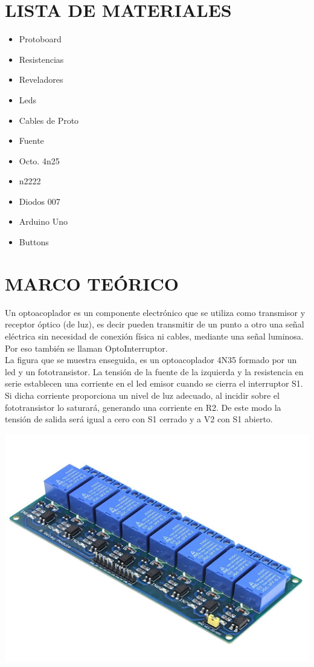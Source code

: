 \documentclass[12pt,letterpaper]{article}
\begin{document}
	\section{\textbf{LISTA DE MATERIALES}}
	\begin{itemize}
	\item Protoboard
	\item Resistencias
	\item Reveladores
	\item Leds
	\item Cables de Proto
	\item Fuente 
	\item Octo. 4n25
	\item n2222
	\item Diodos 007
	\item Arduino Uno
	\item Buttons
	\end{itemize}
	
\section{\textbf{MARCO TEÓRICO}}
	Un optoacoplador es un componente electrónico que se utiliza como transmisor y receptor óptico (de luz), es decir pueden transmitir de un punto a otro una señal eléctrica sin necesidad de conexión física ni cables, mediante una señal luminosa. Por eso también se llaman OptoInterruptor.\\
	La figura que se muestra enseguida, es un optoacoplador 4N35 formado por un led y un fototransistor. La tensión de la fuente de la izquierda y la resistencia en serie establecen una corriente en el led emisor cuando se cierra el interruptor S1. Si dicha corriente proporciona un nivel de luz adecuado, al incidir sobre el fototransistor lo saturará, generando una corriente en R2. De este modo la tensión de salida será igual a cero con S1 cerrado y a V2 con S1 abierto.\\

	\begin{center}
		\includegraphics[scale=0.2]{Modulo-rele-8-canales-con-optoacoplador-arduino-colombia-precio}
	\end{center}
\end{document}

